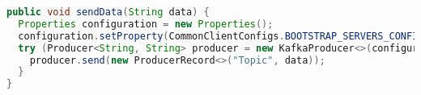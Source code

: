 
\begin{lstlisting}[language=Java, caption={Example of publishing data using Kafka Producer}, label={code:kafka:producer}]
public void sendData(String data) {
  Properties configuration = new Properties();
  configuration.setProperty(CommonClientConfigs.BOOTSTRAP_SERVERS_CONFIG, "localhost:9092");
  try (Producer<String, String> producer = new KafkaProducer<>(configuration)) {
    producer.send(new ProducerRecord<>("Topic", data));
  }
}
\end{lstlisting}
